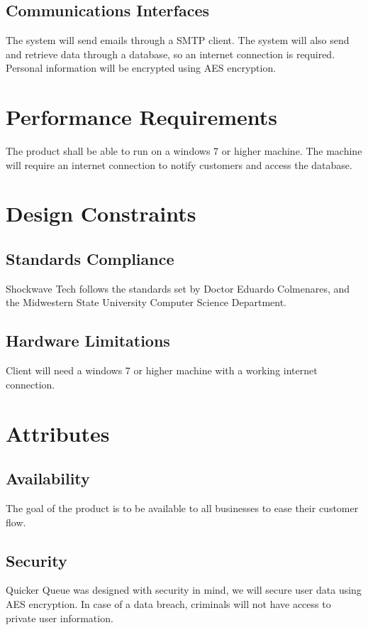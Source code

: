 \documentclass{scrreprt}
\begin{document}
\subsection{Communications Interfaces}
The system will send emails through a SMTP client. The system will also send and retrieve data through a database, so an internet connection is required. Personal information will be encrypted using AES encryption.

\section{Performance Requirements}
The product shall be able to run on a windows 7 or higher machine. The machine will require an internet connection to notify customers and access the database.

\section{Design Constraints}

\subsection{Standards Compliance}
Shockwave Tech follows the standards set by Doctor Eduardo Colmenares, and the Midwestern State University Computer Science Department.
\subsection{Hardware Limitations}
Client will need a windows 7 or higher machine with a working internet connection.

\section{Attributes}

\subsection{Availability}
The goal of the product is to be available to all businesses to ease their customer flow.

\subsection{Security}
Quicker Queue was designed with security in mind, we will secure user data using AES encryption. In case of a data breach, criminals will not have access to private user information.
\end{document}
